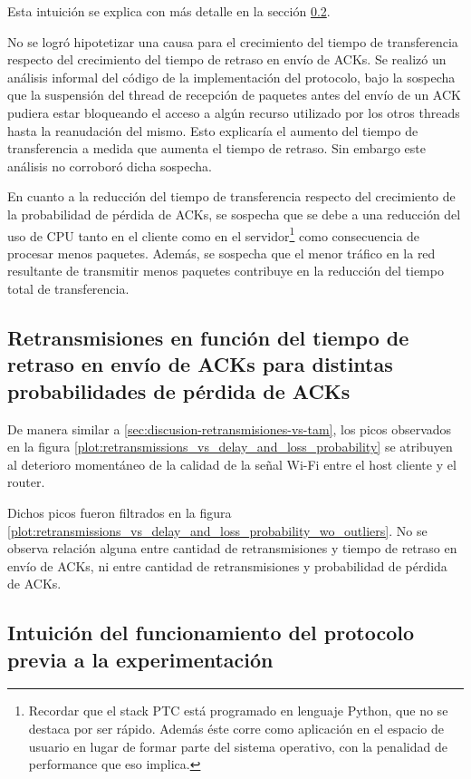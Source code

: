 \documentclass[a4paper, 10pt, twoside]{article}
\begin{document}
Esta intuición se explica con más detalle en la sección \ref{sec:discusion-intuicion}. 

No se logró hipotetizar una causa para el crecimiento del tiempo de transferencia respecto del crecimiento del tiempo de retraso en envío de ACKs. Se realizó un análisis informal del código de la implementación del protocolo, bajo la sospecha que la suspensión del thread de recepción de paquetes antes del envío de un ACK pudiera estar bloqueando el acceso a algún recurso utilizado por los otros threads hasta la reanudación del mismo. Esto explicaría el aumento del tiempo de transferencia a medida que aumenta el tiempo de retraso. Sin embargo este análisis no corroboró dicha sospecha.

En cuanto a la reducción del tiempo de transferencia respecto del crecimiento de la probabilidad de pérdida de ACKs, se sospecha que se debe a una reducción del uso de CPU tanto en el cliente como en el servidor\footnote{Recordar que el stack PTC está programado en lenguaje Python, que no se destaca por ser rápido. Además éste corre como aplicación en el espacio de usuario en lugar de formar parte del sistema operativo, con la penalidad de performance que eso implica.} como consecuencia de procesar menos paquetes. Además, se sospecha que el menor tráfico en la red resultante de transmitir menos paquetes contribuye en la reducción del tiempo total de transferencia.


\subsection{Retransmisiones en función del tiempo de retraso en envío de ACKs para distintas probabilidades de pérdida de ACKs}

De manera similar a \ref{sec:discusion-retransmisiones-vs-tam}, los picos observados en la figura \ref{plot:retransmissions_vs_delay_and_loss_probability} se atribuyen al deterioro momentáneo de la calidad de la señal Wi-Fi entre el host cliente y el router.

Dichos picos fueron filtrados en la figura \ref{plot:retransmissions_vs_delay_and_loss_probability_wo_outliers}. No se observa relación alguna entre cantidad de retransmisiones y tiempo de retraso en envío de ACKs, ni entre cantidad de retransmisiones y probabilidad de pérdida de ACKs.


\subsection{Intuición del funcionamiento del protocolo previa a la experimentación}
\label{sec:discusion-intuicion}
\end{document}
